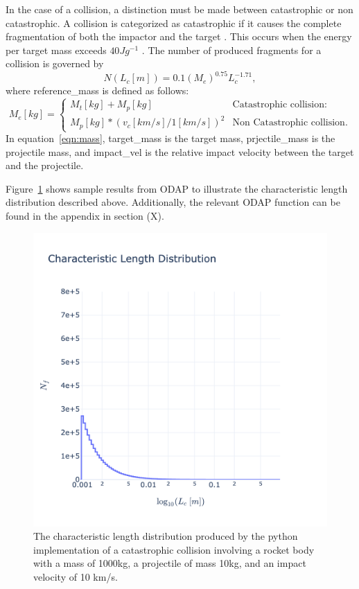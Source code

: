 \documentclass[a4paper, 12pt]{article}
\begin{document}
In the case of a collision, a distinction must be made between catastrophic or non catastrophic. A collision is categorized as catastrophic if it causes the complete fragmentation of both the impactor and the target \citep{letizia_space_2016}. This occurs when the energy per target mass exceeds $40 J g^{-1}$ \citep{krisko_proper_2011}. The number of produced fragments for a collision is governed by
\begin{equation}
	N(L_c [m]) = 0.1 (M_e)^{0.75} L_c^{-1.71},
\end{equation}
where \Gls{reference_mass} is defined as follows: 
\begin{equation}
	M_e[kg] = \begin{cases}
		M_t [kg] + M_p[kg]& \text{Catastrophic collision: } \\
		 M_p[kg] * (v_c [km/s] / 1 [km/s])^2 & \text{Non Catastrophic collision}.	
	\end{cases}
	\label{eqn:mass}
\end{equation}
\noindent In equation~\ref{eqn:mass},  \Gls{target_mass} is the target mass, \Gls{prjectile_mass} is the projectile mass, and \Gls{impact_vel} is the relative impact velocity between the target and the projectile.

Figure~\ref{fig:N_f_v_L_c} shows sample results from ODAP to illustrate the characteristic length distribution described above. Additionally, the relevant ODAP function can be found in the appendix in section (X).
\begin{figure}[H]
	\centering
	\includegraphics[scale=0.3, trim=0cm 0cm 0cm 10cm]{N_f_vs_L_c}
	\caption{The characteristic length distribution produced by the python implementation of a catastrophic collision involving a rocket body with a mass of 1000kg, a projectile of mass 10kg, and an impact velocity of 10 km/s.}
	\label{fig:N_f_v_L_c}
\end{figure}
\end{document}
